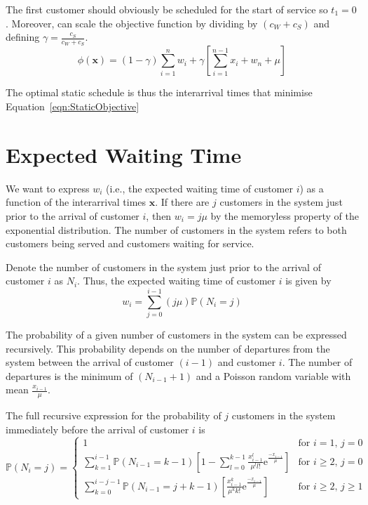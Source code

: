 The first customer should obviously be scheduled for the start of service so $t_{1} = 0$. Moreover, can scale the objective function by dividing by $(c_{W} + c_{S})$ and defining $\gamma = \frac{c_{S}}{c_{W} + c_{S}}$.
\begin{equation}
	\phi (\mathbf{x}) = (1 - \gamma) \sum_{i = 1}^{n} w_{i} + \gamma \left[ \sum_{i = 1}^{n - 1} x_{i} + w_{n} + \mu \right]
	\label{eqn:StaticObjective}
\end{equation}

The optimal static schedule is thus the interarrival times that minimise Equation~\ref{eqn:StaticObjective}

\section{Expected Waiting Time}
We want to express $w_{i}$ (i.e., the expected waiting time of customer $i$) as a function of the interarrival times $\mathbf{x}$. If there are $j$ customers in the system just prior to the arrival of customer $i$, then $w_{i} = j \mu$ by the memoryless property of the exponential distribution. The number of customers in the system refers to both customers being served and customers waiting for service.

Denote the number of customers in the system just prior to the arrival of customer $i$ as $N_{i}$. Thus, the expected waiting time of customer $i$ is given by
\begin{equation}
	w_{i} = \sum_{j = 0}^{i - 1} (j \mu) \mathbb{P} (N_{i} = j)
	\label{eqn:StaticWaiting}
\end{equation}

The probability of a given number of customers in the system can be expressed recursively. This probability depends on the number of departures from the system between the arrival of customer $(i - 1)$ and customer $i$. The number of departures is the minimum of $(N_{i - 1} + 1)$ and a Poisson random variable with mean $\frac{x_{i - 1}}{\mu}$.

The full recursive expression for the probability of $j$ customers in the system immediately before the arrival of customer $i$ is
\begin{equation}
	\mathbb{P} (N_{i} = j) = \begin{cases} 1 & \text{for $i = 1$, $j = 0$} \\
	\sum_{k = 1}^{i - 1} \mathbb{P} (N_{i - 1} = k - 1) \left[ 1 - \sum_{l = 0}^{k - 1} \frac{x_{i - 1}^{l}}{\mu^{l} l!} \mathrm{e}^{\frac{- x_{i - 1}}{\mu}}\right] & \text{for $i \geq 2$, $j = 0$} \\
	\sum_{k = 0}^{i - j - 1} \mathbb{P} (N_{i - 1} = j + k - 1) \left[ \frac{x_{i - 1}^{k}}{\mu^{k} k!} \mathrm{e}^{\frac{- x_{i - 1}}{\mu}} \right] & \text{for $i \geq 2$, $j \geq 1$} \end{cases}
	\label{eqn:StaticProbSystem}
\end{equation}

